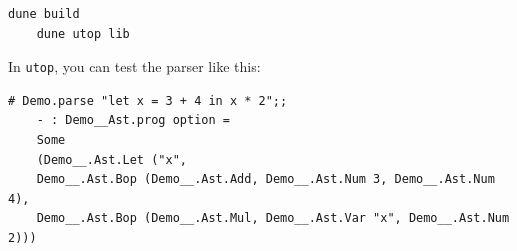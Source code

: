 \begin{Example}
    \begin{lstlisting}[numbers=none]
    dune build
    dune utop lib
    \end{lstlisting}
    
    \noindent
    In \texttt{utop}, you can test the parser like this:
    
    \begin{lstlisting}[numbers=none]
    # Demo.parse "let x = 3 + 4 in x * 2";;
    - : Demo__Ast.prog option =
    Some
    (Demo__.Ast.Let ("x",
    Demo__.Ast.Bop (Demo__.Ast.Add, Demo__.Ast.Num 3, Demo__.Ast.Num 4),
    Demo__.Ast.Bop (Demo__.Ast.Mul, Demo__.Ast.Var "x", Demo__.Ast.Num 2)))
    \end{lstlisting}
    \end{Example}
        
        

